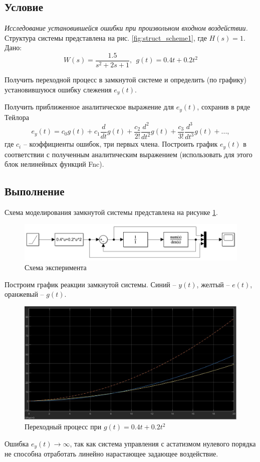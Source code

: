 \documentclass[a4paper, 12pt]{article}
\begin{document}
    \subsection{Условие}
    \textit{Исследование установившейся ошибки при произвольном входном воздействии.}
    Структура системы представлена на рис. \ref{fig:struct_scheme1}, где $H(s)=1$. Дано:
    $$W(s)=\dfrac{1.5}{s^2+2s+1},\ \ g(t)=0.4t+0.2t^2$$
    \begin{compactitem}
    \item Получить переходной процесс в замкнутой системе
    и определить (по графику) установившуюся ошибку слежения $e_y(t)$.
    \item Получить приближенное аналитическое выражение для $e_y(t)$, сохранив в
    ряде Тейлора $$e_y(t)=c_0g(t)+c_1\dfrac{d}{dt}g(t)+\dfrac{c_2}{2!}\dfrac{d^2}{dt^2}g(t)+\dfrac{c_3}{3!}\dfrac{d^3}{dt^3}g(t)+...,$$
    где $c_i$ -- коэффициенты ошибок, три первых члена. Построить график $e_y(t)$
    в соответствии с полученным аналитическим выражением (использовать для этого блок нелинейных функций Fnc).
    \end{compactitem}


    \subsection{Выполнение}
    Схема моделирования замкнутой системы представлена на рисунке \ref{fig:scheme4_1}.
    \begin{figure}[H]
        \centering
        \includegraphics[scale=0.6]{scheme4_1.png}
        \captionsetup{skip=0pt}
        \caption{Схема эксперимента}
        \label{fig:scheme4_1}
    \end{figure}
    \noindent Построим график реакции замкнутой системы.
    Синий -- $y(t)$, желтый -- $e(t)$, оранжевый -- $g(t)$.
    \begin{figure}[H]
        \centering
        \includegraphics[scale=0.3]{task_4_1.jpg}
        \captionsetup{skip=0pt}
        \caption{Переходный процесс при $g(t)=0.4t+0.2t^2$}
        \label{fig:task_4_1}
    \end{figure}
    \noindent Ошибка $e_y(t)\rightarrow\infty$, так как система управления с астатизмом
    нулевого порядка не способна отработать линейно нарастающее задающее воздействие.
\end{document}
